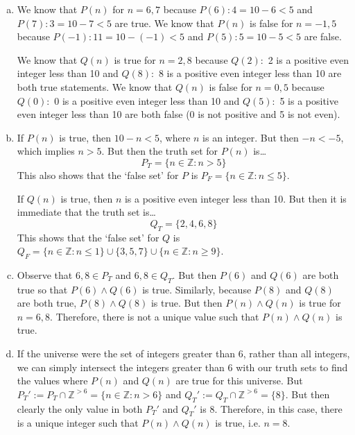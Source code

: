 \documentclass[11pt,letterpaper]{article}
\begin{document}
\sol 
\begin{enumerate}[(a)]
\item We know that $P(n)$ for $n= 6, 7$ because $P(6): 4= 10 - 6 < 5$ and $P(7): 3= 10 - 7 < 5$ are true. We know that $P(n)$ is false for $n= -1, 5$ because $P(-1): 11= 10 - (-1) < 5$ and $P(5): 5= 10 - 5 < 5$ are false. \pspace

We know that $Q(n)$ is true for $n= 2, 8$ because $Q(2):$ 2 is a positive even integer less than 10 and $Q(8):$ 8 is a positive even integer less than 10 are both true statements. We know that $Q(n)$ is false for $n= 0, 5$ because $Q(0):$ 0 is a positive even integer less than 10 and $Q(5):$ 5 is a positive even integer less than 10 are both false (0 is not positive and 5 is not even). \pspace

\item If $P(n)$ is true, then $10 - n < 5$, where $n$ is an integer. But then $-n < -5$, which implies $n > 5$. But then the truth set for $P(n)$ is\dots
	\[
	P_T= \{ n \in \mathbb{Z} \colon n > 5 \}
	\]
This also shows that the `false set' for $P$ is $P_F= \{ n \in \mathbb{Z} \colon n \leq 5 \}$. \pspace

If $Q(n)$ is true, then $n$ is a positive even integer less than 10. But then it is immediate that the truth set is\dots
	\[
	Q_T= \{ 2, 4, 6, 8 \}
	\]
This shows that the `false set' for $Q$ is $Q_F= \{ n \in \mathbb{Z} \colon n \leq 1 \} \cup \{ 3, 5, 7 \} \cup \{ n \in \mathbb{Z} \colon n \geq 9 \}$. \pspace

\item Observe that $6, 8 \in P_T$ and $6, 8 \in Q_T$. But then $P(6)$ and $Q(6)$ are both true so that $P(6) \wedge Q(6)$ is true. Similarly, because $P(8)$ and $Q(8)$ are both true, $P(8) \wedge Q(8)$ is true. But then $P(n) \wedge Q(n)$ is true for $n= 6, 8$. Therefore, there is not a unique value such that $P(n) \wedge Q(n)$ is true. \pspace

\item If the universe were the set of integers greater than 6, rather than all integers, we can simply intersect the integers greater than 6 with our truth sets to find the values where $P(n)$ and $Q(n)$ are true for this universe. But $P_T':= P_T \cap \mathbb{Z}^{> 6}= \{ n \in \mathbb{Z} \colon n > 6 \}$ and $Q_T':= Q_T \cap \mathbb{Z}^{> 6}= \{ 8 \}$. But then clearly the only value in both $P_T'$ and $Q_T'$ is 8. Therefore, in this case, there is a unique integer such that $P(n) \wedge Q(n)$ is true, i.e. $n= 8$. 
\end{enumerate}
	
\end{document}
